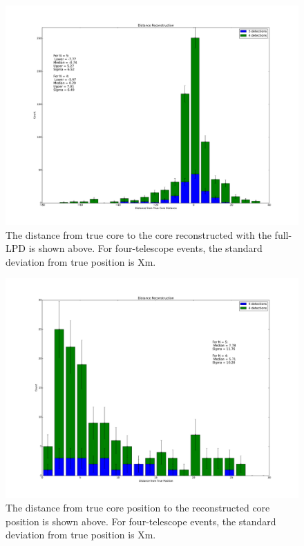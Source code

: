 \documentclass{article}
\begin{document}
\begin{figure}
\begin{center}
\includegraphics[width=\textwidth]{coredistance}
\caption{The distance from true core to the core reconstructed with the full-LPD is shown above. For four-telescope events, the standard deviation from true position is Xm. }
\label{fig:coredistance}
\end{center}
\end{figure}

\begin{figure}
\begin{center}
\includegraphics[width=\textwidth]{position}
\caption{The distance from true core position to the reconstructed core position is shown above. For four-telescope events, the standard deviation from true position is Xm.}
\label{fig:position}
\end{center}
\end{figure}
\end{document}
